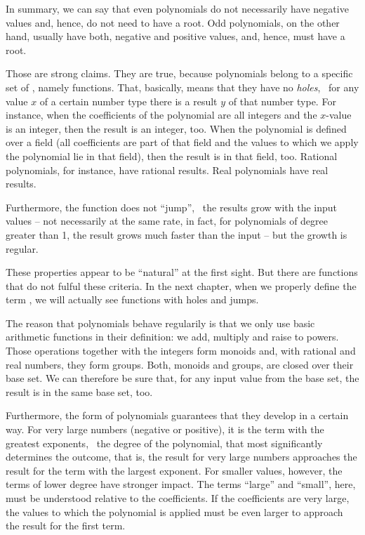 \documentclass[tikz]{scrreprt}
\begin{document}
In summary, we can say that even polynomials do not necessarily
have negative values and, hence, do not need to have a root.
Odd polynomials, on the other hand, usually have both, negative
and positive values, and, hence, must have a root.

Those are strong claims. They are true, because polynomials
belong to a specific set of , 
namely  functions.
That, basically, means that they have no \emph{holes}, \ie\
for any value $x$ of a certain number type there is a result $y$
of that number type. For instance, when the coefficients of the
polynomial are all integers and the $x$-value is an integer,
then the result is an integer, too. When the polynomial is defined
over a field (all coefficients are part of that field and
the values to which we apply the polynomial lie in that field),
then the result is in that field, too. Rational polynomials,
for instance, have rational results. 
Real polynomials have real results.

Furthermore, the function does not ``jump'', \ie\ the results
grow with the input values -- not necessarily
at the same rate, in fact, for polynomials of degree greater than 1,
the result grows much faster than the input -- but the growth
is regular.

These properties appear to be ``natural'' at the first sight.
But there are functions that do not fulful these criteria.
In the next chapter, when we properly define the term ,
we will actually see functions with holes and jumps.

The reason that polynomials behave regularily is that we only
use basic arithmetic functions in their definition: we add, multiply
and raise to powers. 
Those operations together with the integers form monoids and,
with rational and real numbers, they form groups.
Both, monoids and groups, are closed over their base set.
We can therefore be sure that, for any input value from the base set,
the result is in the same base set, too.

Furthermore, the form of polynomials guarantees that they develop
in a certain way. For very large numbers (negative or positive), 
it is the term with the greatest exponents, \ie\ the degree 
of the polynomial, that most significantly determines the
outcome, that is, the result for very large numbers
approaches the result for the term with the largest exponent. 
For smaller values, however, the terms of lower degree have
stronger impact. The terms ``large'' and ``small'', here, 
must be understood relative to the coefficients. If the coefficients
are very large, the values to which the polynomial is applied
must be even larger to approach the result for the first term.
\end{document}
